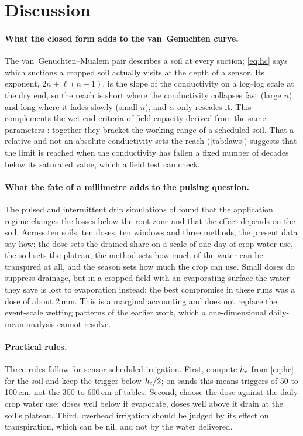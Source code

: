 \section{Discussion}
\paragraph{What the closed form adds to the van~Genuchten curve.}
The van~Genuchten--Mualem pair describes a soil at every suction; \cref{eq:hc} says which suctions a cropped soil actually visits at the depth of a sensor. Its exponent, $2n+\ell(n-1)$, is the slope of the conductivity on a log--log scale at the dry end, so the reach is short where the conductivity collapses fast (large $n$) and long where it fades slowly (small $n$), and $\alpha$ only rescales it. This complements the wet-end criteria of field capacity derived from the same parameters \citep{Twarakavi2009,Assouline2014}: together they bracket the working range of a scheduled soil. That a relative and not an absolute conductivity sets the reach (\cref{tab:laws}) suggests that the limit is reached when the conductivity has fallen a fixed number of decades below its saturated value, which a field test can check.

\paragraph{What the fate of a millimetre adds to the pulsing question.}
The pulsed and intermittent drip simulations of \citet{Elmaloglou2007,Elmaloglou2008,Elmaloglou2009b} found that the application regime changes the losses below the root zone and that the effect depends on the soil. Across ten soils, ten doses, ten windows and three methods, the present data say how: the dose sets the drained share on a scale of one day of crop water use, the soil sets the plateau, the method sets how much of the water can be transpired at all, and the season sets how much the crop can use. Small doses do suppress drainage, but in a cropped field with an evaporating surface the water they save is lost to evaporation instead; the best compromise in these runs was a dose of about 2\,mm. This is a marginal accounting and does not replace the event-scale wetting patterns of the earlier work, which a one-dimensional daily-mean analysis cannot resolve.

\paragraph{Practical rules.}
Three rules follow for sensor-scheduled irrigation. First, compute $h_{\mathrm{c}}$ from \cref{eq:hc} for the soil and keep the trigger below $h_{\mathrm{c}}/2$; on sands this means triggers of 50 to 100\,cm, not the 300 to 600\,cm of tables. Second, choose the dose against the daily crop water use: doses well below it evaporate, doses well above it drain at the soil's plateau. Third, overhead irrigation should be judged by its effect on transpiration, which can be nil, and not by the water delivered.

